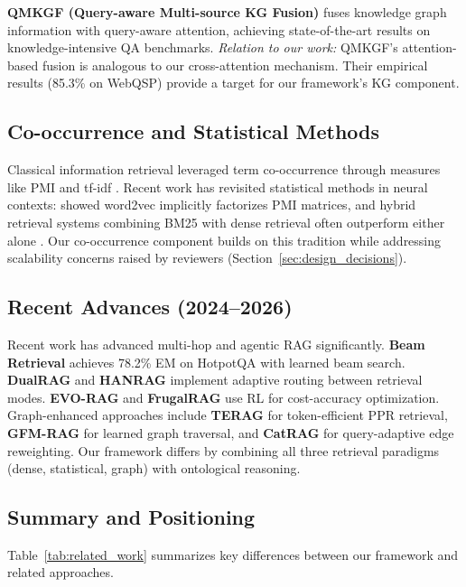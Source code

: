 \documentclass[11pt,a4paper]{article}
\begin{document}
\textbf{QMKGF (Query-aware Multi-source KG Fusion)} \citep{qmkgf2024} fuses knowledge graph information with query-aware attention, achieving state-of-the-art results on knowledge-intensive QA benchmarks. \textit{Relation to our work:} QMKGF's attention-based fusion is analogous to our cross-attention mechanism. Their empirical results (85.3\% on WebQSP) provide a target for our framework's KG component.

\subsection{Co-occurrence and Statistical Methods}

Classical information retrieval leveraged term co-occurrence through measures like PMI and tf-idf \citep{manning2008introduction}. Recent work has revisited statistical methods in neural contexts: \citet{levy2014neural} showed word2vec implicitly factorizes PMI matrices, and hybrid retrieval systems combining BM25 with dense retrieval often outperform either alone \citep{ma2023hybrid}. Our co-occurrence component builds on this tradition while addressing scalability concerns raised by reviewers (Section~\ref{sec:design_decisions}).

\subsection{Recent Advances (2024--2026)}

Recent work has advanced multi-hop and agentic RAG significantly. \textbf{Beam Retrieval} \citep{beam2024} achieves 78.2\% EM on HotpotQA with learned beam search. \textbf{DualRAG} \citep{dualrag2025} and \textbf{HANRAG} \citep{hanrag2025} implement adaptive routing between retrieval modes. \textbf{EVO-RAG} \citep{evorag2025} and \textbf{FrugalRAG} \citep{frugalrag2025} use RL for cost-accuracy optimization. Graph-enhanced approaches include \textbf{TERAG} \citep{terag2025} for token-efficient PPR retrieval, \textbf{GFM-RAG} \citep{gfmrag2025} for learned graph traversal, and \textbf{CatRAG} \citep{catrag2025} for query-adaptive edge reweighting. Our framework differs by combining all three retrieval paradigms (dense, statistical, graph) with ontological reasoning.

\subsection{Summary and Positioning}

Table~\ref{tab:related_work} summarizes key differences between our framework and related approaches.
\end{document}
